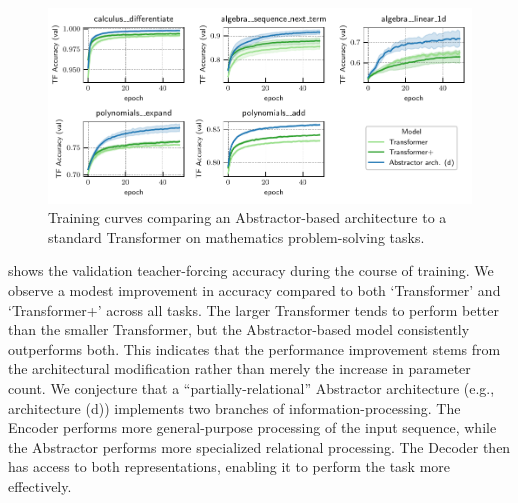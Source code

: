\begin{figure}[t]
    \vskip-15pt
    \centering
    \includegraphics[width=\textwidth]{figures/experiments/math_training_curves.pdf}
    \vskip-10pt
    \caption{Training curves comparing an Abstractor-based architecture to a standard Transformer on mathematics problem-solving tasks.}\label{fig:math_training_curves}
    \vskip -15pt
\end{figure}

 shows the validation teacher-forcing accuracy during the course of training. We observe a modest improvement in accuracy compared to both `Transformer' and `Transformer+' across all tasks. The larger Transformer tends to perform better than the smaller Transformer, but the Abstractor-based model consistently outperforms both. This indicates that the performance improvement stems from the architectural modification rather than merely the increase in parameter count. We conjecture that a ``partially-relational'' Abstractor architecture (e.g., architecture (d)) implements two branches of information-processing. The Encoder performs more general-purpose processing of the input sequence, while the Abstractor performs more specialized relational processing. The Decoder then has access to both representations, enabling it to perform the task more effectively.
